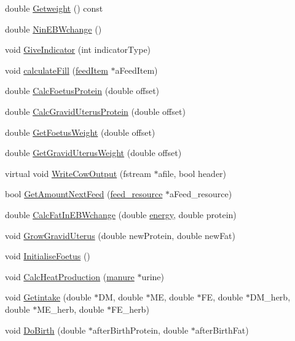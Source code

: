 \begin{DoxyCompactItemize}
\item 
double \hyperlink{classdk__cattle_a2c73fdc5a59294459de1a0a193e9ea3a}{Getweight} () const 
\item 
double \hyperlink{classdk__cattle_a15d4305d06c0046414ba06a00904c0b9}{NinEBWchange} ()
\item 
void \hyperlink{classdk__cattle_ad8e041161b0fc41e5fecd82efb58c4ec}{GiveIndicator} (int indicatorType)
\item 
void \hyperlink{classdk__cattle_a8e9fc5cc85f1bb6080fbf20bb7586c40}{calculateFill} (\hyperlink{classfeed_item}{feedItem} $\ast$aFeedItem)
\item 
double \hyperlink{classdk__cattle_a717bc099891c28ae2f35203a23bc1b12}{CalcFoetusProtein} (double offset)
\item 
double \hyperlink{classdk__cattle_a86bb4b01472df3578ac25b97d39af5b8}{CalcGravidUterusProtein} (double offset)
\item 
double \hyperlink{classdk__cattle_a360aab1d0df345d99791e00292999a94}{GetFoetusWeight} (double offset)
\item 
double \hyperlink{classdk__cattle_a1df5fbfbccd961fab8ec58af68acec61}{GetGravidUterusWeight} (double offset)
\item 
virtual void \hyperlink{classdk__cattle_a8e14614bee3bdaa807a889d5c0b0625f}{WriteCowOutput} (fstream $\ast$afile, bool header)
\item 
bool \hyperlink{classdk__cattle_a583f0e54f2b9c689cf2dc9935226e696}{GetAmountNextFeed} (\hyperlink{classfeed__resource}{feed\_\-resource} $\ast$aFeed\_\-resource)
\item 
double \hyperlink{classdk__cattle_affb783822317f9745f837efaaca3d098}{CalcFatInEBWchange} (double \hyperlink{classenergy}{energy}, double protein)
\item 
void \hyperlink{classdk__cattle_aa008034a90d25b2682169fc87651a45b}{GrowGravidUterus} (double newProtein, double newFat)
\item 
void \hyperlink{classdk__cattle_aa0979fed4c6facc5d1dbd86c38faaa13}{InitialiseFoetus} ()
\item 
void \hyperlink{classdk__cattle_af224d866e6cffe1530ecd307d518c4e7}{CalcHeatProduction} (\hyperlink{classmanure}{manure} $\ast$urine)
\item 
void \hyperlink{classdk__cattle_a5a2d0118d148a07540eea1dc1beded3f}{Getintake} (double $\ast$DM, double $\ast$ME, double $\ast$FE, double $\ast$DM\_\-herb, double $\ast$ME\_\-herb, double $\ast$FE\_\-herb)
\item 
void \hyperlink{classdk__cattle_ab17aa2f9b98e96a0175282b988a23d5a}{DoBirth} (double $\ast$afterBirthProtein, double $\ast$afterBirthFat)

\end{DoxyCompactItemize}
